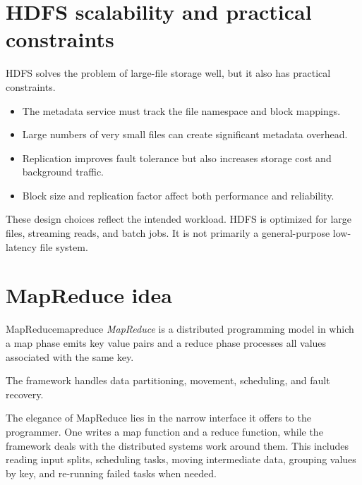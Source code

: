 \documentclass[11pt,a4paper,openany]{book}
\begin{document}
\section{HDFS scalability and practical constraints}
HDFS solves the problem of large-file storage well, but it also has practical constraints.

\begin{itemize}
\item The metadata service must track the file namespace and block mappings.
\item Large numbers of very small files can create significant metadata overhead.
\item Replication improves fault tolerance but also increases storage cost and background traffic.
\item Block size and replication factor affect both performance and reliability.
\end{itemize}

These design choices reflect the intended workload. HDFS is optimized for large files, streaming reads, and batch jobs. It is not primarily a general-purpose low-latency file system.

\section{MapReduce idea}
\begin{definition}{MapReduce}{mapreduce}
\emph{MapReduce} is a distributed programming model in which a map phase emits key value pairs and a reduce phase processes all values associated with the same key.
\end{definition}

The framework handles data partitioning, movement, scheduling, and fault recovery.

The elegance of MapReduce lies in the narrow interface it offers to the programmer. One writes a map function and a reduce function, while the framework deals with the distributed systems work around them. This includes reading input splits, scheduling tasks, moving intermediate data, grouping values by key, and re-running failed tasks when needed.
\end{document}
